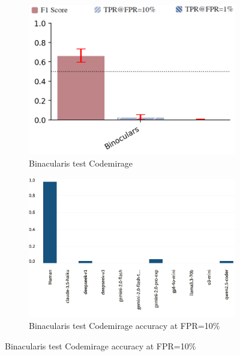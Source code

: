 \begin{figure}[H]
    \begin{subfigure}[b]{0.4\textwidth}
        \centering
        \includegraphics[width=\linewidth]{img/TEST/Binacularis/CodeMirage.png}
        \caption{Binacularis test Codemirage}
        \label{fig:5}
    \end{subfigure}
    \hfill
    \begin{subfigure}[t]{0.4\textwidth}
        \centering
        \includegraphics[width=\linewidth]{img/TEST/Binacularis_standard/visualization(13)d.png}
        \caption{Binacularis test Codemirage accuracy at FPR=10\%}
        \label{fig:b5}
    \end{subfigure}
\end{figure}


